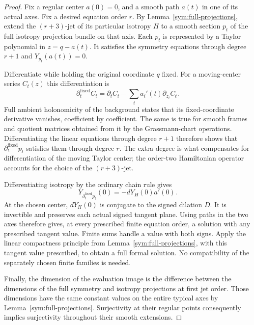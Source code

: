 \begin{proof}
Fix a regular center $a(0)=0$, and a smooth path $a(t)$ in one of its
actual axes.  Fix a desired equation order $r$.  By
Lemma~\ref{sym:full-projections}, extend the $(r+3)$-jet of its
particular isotropy $H$ to a smooth section $p_t$ of the full isotropy
projection bundle on that axis.  Each $p_t$ is represented by a
Taylor polynomial in $z=q-a(t)$.  It satisfies the symmetry equations
through degree $r+1$ and $Y_{p_t}(a(t))=0$.

Differentiate while holding the original coordinate $q$ fixed.
For a moving-center series $C_t(z)$ this differentiation is
\[
 \partial_t^{\mathrm{fixed}}C_t
   =\partial_t C_t-\sum_i a_i'(t)\partial_{z_i}C_t.
\]
Full ambient holonomicity of the background states that its
fixed-coordinate derivative vanishes, coefficient by coefficient.
The same is true for smooth frames and quotient matrices obtained
from it by the Grassmann-chart operations.  Differentiating the
linear equations through degree $r+1$ therefore shows that
$\partial_t^{\mathrm{fixed}}p_t$ satisfies them through degree $r$.
The extra degree is what compensates for differentiation of the
moving Taylor center; the order-two Hamiltonian operator accounts
for the choice of the $(r+3)$-jet.

Differentiating isotropy by the ordinary chain rule gives
\begin{equation}
 \label{sym:differentiated-value}
 Y_{\partial_t^{\mathrm{fixed}}p_t}(0)
   =-dY_H(0)a'(0).
\end{equation}
At the chosen center, $dY_H(0)$ is conjugate to the signed dilation
$D$. It is invertible and preserves each actual signed tangent plane.
Using paths in the two axes therefore gives, at every prescribed
finite equation order, a solution with any prescribed tangent
value.  Finite sums handle a value with both signs.  Apply the
linear compactness principle from
Lemma~\ref{sym:full-projections}, with this tangent value prescribed,
to obtain a full formal solution.  No compatibility of the
separately chosen finite families is needed.

Finally, the dimension of the evaluation image is the difference
between the dimensions of the full symmetry and isotropy
projections at first jet order.  Those dimensions have the same
constant values on the entire typical axes by
Lemma~\ref{sym:full-projections}.  Surjectivity at their regular
points consequently implies surjectivity throughout their smooth
extensions.
\end{proof}

